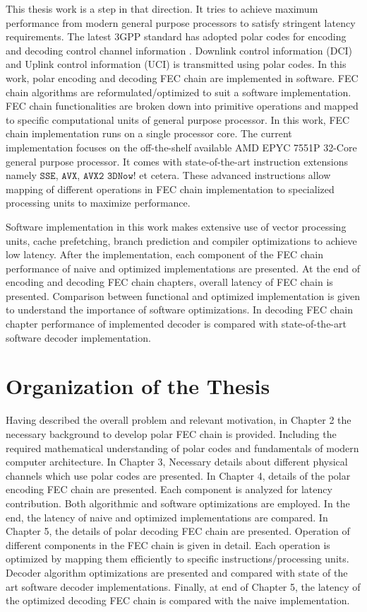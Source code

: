 This thesis work is a step in that direction. It tries to achieve maximum performance from modern general purpose processors to satisfy stringent latency requirements. The latest 3GPP standard has adopted polar codes for encoding and decoding control channel information \cite{3gpp.38.212}. Downlink control information (DCI) and Uplink control information (UCI) is transmitted using polar codes. In this work, polar encoding and decoding FEC chain are implemented in software. FEC chain algorithms are reformulated/optimized to suit a software implementation. FEC chain functionalities are broken down into primitive operations and mapped to specific computational units of general purpose processor. In this work, FEC chain implementation runs on a single processor core. The current implementation focuses on the off-the-shelf available AMD EPYC 7551P 32-Core general purpose processor\cite{amdEpyc}. It comes with state-of-the-art instruction extensions namely $\mathtt{SSE}$, $\mathtt{AVX}$, $\mathtt{AVX2}$ $\mathtt{3DNow!}$ et cetera. These advanced instructions allow mapping of different operations in FEC chain implementation to specialized processing units to maximize performance. 

Software implementation in this work makes extensive use of vector processing units, cache prefetching, branch prediction and compiler optimizations to achieve low latency. After the implementation, each component of the FEC chain performance of naive and optimized implementations are presented. At the end of encoding and decoding FEC chain chapters, overall latency of FEC chain is presented. Comparison between functional and optimized implementation is given to understand the importance of software optimizations. In decoding FEC chain chapter performance of implemented decoder is compared with state-of-the-art software decoder implementation\cite{lowLatencySWPolarDec}.

\section*{Organization of the Thesis}
Having described the overall problem and relevant motivation, in Chapter 2 the necessary background to develop polar FEC chain is provided. Including the required mathematical understanding of polar codes and fundamentals of modern computer architecture. In Chapter 3, Necessary details about different physical channels which use polar codes are presented. In Chapter 4, details of the polar encoding FEC chain are presented. Each component is analyzed for latency contribution. Both algorithmic and software optimizations are employed. In the end, the latency of naive and optimized implementations are compared. In Chapter 5, the details of polar decoding FEC chain are presented. Operation of different components in the FEC chain is given in detail. Each operation is optimized by mapping them efficiently to specific instructions/processing units. Decoder algorithm optimizations are presented and compared with state of the art software decoder implementations. Finally, at end of Chapter 5, the latency of the optimized decoding FEC chain is compared with the naive implementation.